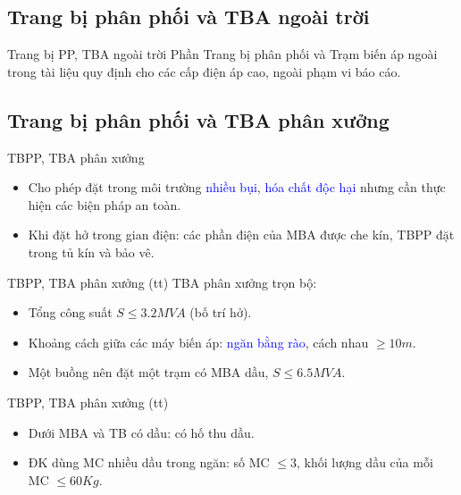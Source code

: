 \documentclass[20pt]{beamer}
\newcommand{\noibat}[1]{\textcolor{blue}{#1}} %
\begin{document}
\subsection*{Trang bị phân phối và TBA ngoài trời}
\begin{frame}{Trang bị PP, TBA ngoài trời}
\justifying
	Phần Trang bị phân phối và Trạm biến áp ngoài trong tài liệu quy định cho các cấp điện áp cao, ngoài phạm vi báo cáo.
\end{frame}


\subsection*{Trang bị phân phối và TBA phân xưởng}
\begin{frame}{TBPP, TBA phân xưởng}
	\begin{itemize}
	\justifying
		\item \alert{Cho phép} đặt trong môi trường \noibat{nhiều bụi}, \noibat{hóa chất độc hại} nhưng cần thực hiện \alert{các biện pháp an toàn}.
		
		\item Khi đặt hở trong gian điện: các phần điện của MBA được che kín, TBPP đặt trong tủ kín và bảo vê.
	\end{itemize}
\end{frame}

\begin{frame}{TBPP, TBA phân xưởng (tt)}
	TBA phân xưởng trọn bộ:
	\begin{itemize}
	\justifying
		\item Tổng công suất $S \leq 3.2MVA$ (bố trí hở).
		
		\item \alert{Khoảng cách giữa các máy biến áp:} \noibat{ngăn bằng rào}, cách nhau $\geq 10m$.
		\item Một buồng nên đặt một trạm có MBA dầu, $S\leq 6.5MVA$.
	\end{itemize}
\end{frame}

\begin{frame}{TBPP, TBA phân xưởng (tt)}
	\begin{itemize}
	\justifying
		\item Dưới MBA và TB có dầu: có hố thu dầu.
		\item ĐK dùng MC nhiều dầu trong ngăn: số MC $\leq 3$, khối lượng dầu của mỗi MC $\leq 60Kg$.
	\end{itemize}
\end{frame}
\end{document}
